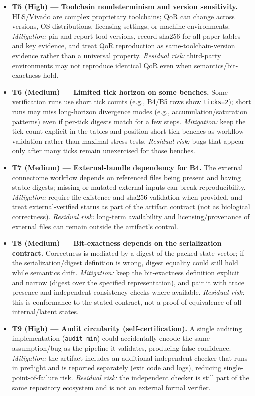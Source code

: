 \begin{itemize}
\item \textbf{T5 (High) --- Toolchain nondeterminism and version sensitivity.} HLS/Vivado are complex proprietary toolchains; QoR can change across versions, OS distributions, licensing settings, or machine environments. \textit{Mitigation:} pin and report tool versions, record sha256 for all paper tables and key evidence, and treat QoR reproduction as same-toolchain-version evidence rather than a universal property. \textit{Residual risk:} third-party environments may not reproduce identical QoR even when semantics/bit-exactness hold.

\item \textbf{T6 (Medium) --- Limited tick horizon on some benches.} Some verification runs use short tick counts (e.g., B4/B5 rows show \texttt{ticks=2}); short runs may miss long-horizon divergence modes (e.g., accumulation/saturation patterns) even if per-tick digests match for a few steps. \textit{Mitigation:} keep the tick count explicit in the tables and position short-tick benches as workflow validation rather than maximal stress tests. \textit{Residual risk:} bugs that appear only after many ticks remain unexercised for those benches.

\item \textbf{T7 (Medium) --- External-bundle dependency for B4.} The external connectome workflow depends on referenced files being present and having stable digests; missing or mutated external inputs can break reproducibility. \textit{Mitigation:} require file existence and sha256 validation when provided, and treat external-verified status as part of the artifact contract (not as biological correctness). \textit{Residual risk:} long-term availability and licensing/provenance of external files can remain outside the artifact's control.

\item \textbf{T8 (Medium) --- Bit-exactness depends on the serialization contract.} Correctness is mediated by a digest of the packed state vector; if the serialization/digest definition is wrong, digest equality could still hold while semantics drift. \textit{Mitigation:} keep the bit-exactness definition explicit and narrow (digest over the specified representation), and pair it with trace presence and independent consistency checks where available. \textit{Residual risk:} this is conformance to the stated contract, not a proof of equivalence of all internal/latent states.

\item \textbf{T9 (High) --- Audit circularity (self-certification).} A single auditing implementation (\texttt{audit\_min}) could accidentally encode the same assumption/bug as the pipeline it validates, producing false confidence. \textit{Mitigation:} the artifact includes an additional independent checker that runs in preflight and is reported separately (exit code and logs), reducing single-point-of-failure risk. \textit{Residual risk:} the independent checker is still part of the same repository ecosystem and is not an external formal verifier.


\end{itemize}
